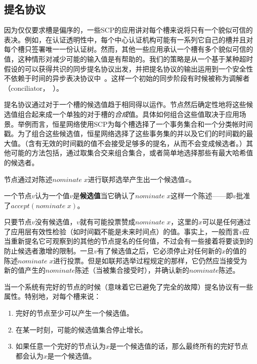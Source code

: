 \subsection{提名协议}

因为仅仅要求槽是偏序的，一些SCP的应用讲对每个槽来说将只有一个貌似可信的表决。例如，在认证透明性中，每个中心认证机构可能有一系列它自己的槽并且对每个槽只签署唯一一份认证树。然而，其他一些应用承认一个槽有多个貌似可信的值，这种情形对减少可能的输入值是有帮助的。我们的策略是从一个基于某种超时假设的可以获得共识的同步提名协议出发，并把提名协议的输出运用到一个安全性不依赖于时间的异步表决协议中~\cite{Lamport:2011:BAL:2075029.2075043}。这样一个初始的同步阶段有时候被称为调解者（conciliator，~\cite{Aspnes:2010:MAS:1835698.1835802}）。

提名协议通过对于一个槽的候选值趋于相同得以运作。节点然后确定性地将这些候选值组合起来成一个单独的对于槽的\textit{合成}值。具体如何组合这些值取决于应用场景。举例而言，恒星网络使用SCP为每个槽选择了一个事务集合和一个分类帐时间戳。为了组合这些候选值，恒星网络选择了这些事务集的并以及它们的时间戳的最大值。（含有无效的时间戳的值不会接受足够多的提名，从而不会变成候选者。）其他可能的方法包括，通过取集合交来组合集合，或者简单地选择那些有最大哈希值的候选者。

节点通过对陈述$nominate\;x$进行联邦选举产生出一个候选值$x$。

\begin{definition}[候选的]
	一个节点$v$认为一个值$v$是\textbf{候选值}当它确认了$nominate\;x$这样一个陈述——即$v$批准了$accept(nominate\;x)$。
\end{definition}

只要节点$v$没有候选值，$v$就有可能投票赞成$nominate\;x$，这里的$x$可以是任何通过了应用层有效性检验（如时间戳不能是未来时间点）的值。事实上，一般而言$v$应当重新提名它可观察到的其他的节点提名的任何值，不过会有一些接着将要谈到的防止候选者激增的限制。一旦$v$有了候选值之后，它必须停止对任何新的$x$的值的陈述$nominate\;x$进行投票。但是如联邦选举过程规定的那样，它仍然应当接受为新的值产生的$nominate$陈述（当被{\vblock}集合接受时），并确认新的$nominate$陈述。

当一个系统有完好的节点的时候（意味着它已避免了完全的故障）提名协议有一些属性。特别地，对每个槽来说：
\begin{enumerate}
	\item\label{enum:cand_p1} 完好的节点至少可以产生一个候选值。
	\item\label{enum:cand_p2} 在某一时刻，可能的候选值集合停止增长。
	\item\label{enum:cand_p3} 如果任意一个完好的节点认为$x$是一个候选值的话，那么最终所有的完好节点都会认为$x$是一个候选值。
\end{enumerate}

